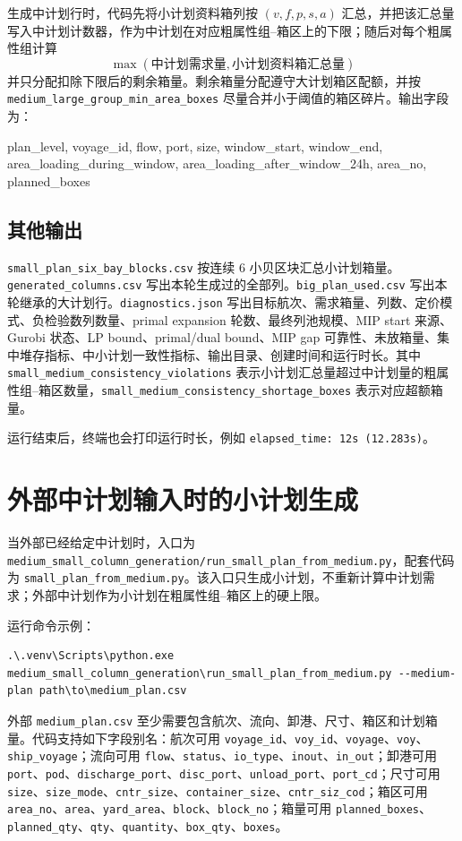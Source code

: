 \documentclass[UTF8,a4paper,11pt]{ctexart}
\newcommand{\code}[1]{\nolinkurl{#1}}
\begin{document}
生成中计划行时，代码先将小计划资料箱列按 \((v,f,p,s,a)\) 汇总，并把该汇总量写入中计划计数器，作为中计划在对应粗属性组--箱区上的下限；随后对每个粗属性组计算
\[
\max(\text{中计划需求量},\text{小计划资料箱汇总量})
\]
并只分配扣除下限后的剩余箱量。剩余箱量分配遵守大计划箱区配额，并按 \code{medium_large_group_min_area_boxes} 尽量合并小于阈值的箱区碎片。输出字段为：
\begin{flushleft}\small\ttfamily
plan\_level, voyage\_id, flow, port, size, window\_start, window\_end,\\
area\_loading\_during\_window, area\_loading\_after\_window\_24h, area\_no, planned\_boxes
\end{flushleft}

\subsection{其他输出}

\code{small_plan_six_bay_blocks.csv} 按连续 6 小贝区块汇总小计划箱量。\code{generated_columns.csv} 写出本轮生成过的全部列。\code{big_plan_used.csv} 写出本轮继承的大计划行。\code{diagnostics.json} 写出目标航次、需求箱量、列数、定价模式、负检验数列数量、primal expansion 轮数、最终列池规模、MIP start 来源、Gurobi 状态、LP bound、primal/dual bound、MIP gap 可靠性、未放箱量、集中堆存指标、中小计划一致性指标、输出目录、创建时间和运行时长。其中 \code{small_medium_consistency_violations} 表示小计划汇总量超过中计划量的粗属性组--箱区数量，\code{small_medium_consistency_shortage_boxes} 表示对应超额箱量。

运行结束后，终端也会打印运行时长，例如 \code{elapsed_time: 12s (12.283s)}。

\section{外部中计划输入时的小计划生成}
\label{sec:external-medium-input}

当外部已经给定中计划时，入口为 \code{medium_small_column_generation/run_small_plan_from_medium.py}，配套代码为 \code{small_plan_from_medium.py}。该入口只生成小计划，不重新计算中计划需求；外部中计划作为小计划在粗属性组--箱区上的硬上限。

运行命令示例：
\begin{lstlisting}
.\.venv\Scripts\python.exe medium_small_column_generation\run_small_plan_from_medium.py --medium-plan path\to\medium_plan.csv
\end{lstlisting}

外部 \code{medium_plan.csv} 至少需要包含航次、流向、卸港、尺寸、箱区和计划箱量。代码支持如下字段别名：航次可用 \code{voyage_id}、\code{voy_id}、\code{voyage}、\code{voy}、\code{ship_voyage}；流向可用 \code{flow}、\code{status}、\code{io_type}、\code{inout}、\code{in_out}；卸港可用 \code{port}、\code{pod}、\code{discharge_port}、\code{disc_port}、\code{unload_port}、\code{port_cd}；尺寸可用 \code{size}、\code{size_mode}、\code{cntr_size}、\code{container_size}、\code{cntr_siz_cod}；箱区可用 \code{area_no}、\code{area}、\code{yard_area}、\code{block}、\code{block_no}；箱量可用 \code{planned_boxes}、\code{planned_qty}、\code{qty}、\code{quantity}、\code{box_qty}、\code{boxes}。
\end{document}
